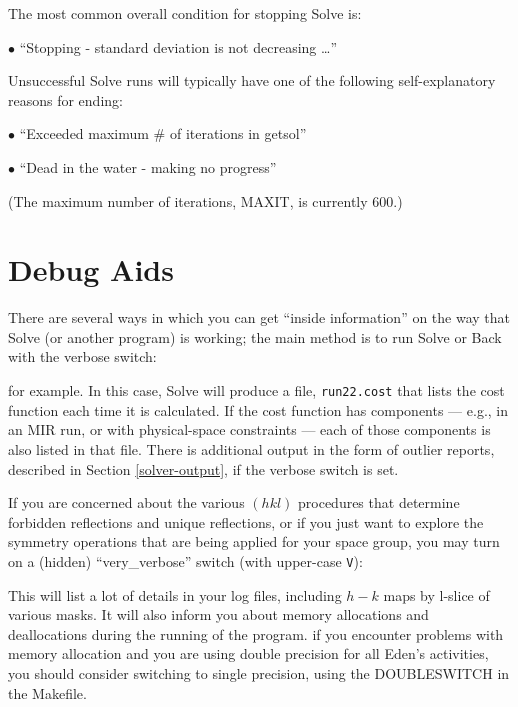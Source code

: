 \documentclass{report}
\begin{document}
{\vspace {0.1in}

The most common overall condition for stopping Solve is:

$\bullet$ ``Stopping - standard deviation is not decreasing \dots ''

\vspace {0.1in}

Unsuccessful Solve runs will typically have one of the following 
self-explanatory reasons for ending:

$\bullet$ ``Exceeded maximum \# of iterations in getsol''

$\bullet$ ``Dead in the water - making no progress''

(The maximum number of iterations, MAXIT, is currently 600.)

\section {Debug Aids}
\label{advanced-debug}


There are several ways in which you can get ``inside information'' on the
way that Solve (or another program) is working; the main method
is to run Solve or Back with the verbose switch:


for example.  In this case, Solve will produce a file, {\tt run22.cost} that
lists the cost function each time it is calculated.  If the cost function 
has components --- e.g., in an MIR run, 
or with physical-space constraints
--- each of those components is also listed in that file.
There is additional output in the form of outlier reports, described in 
Section \ref{solver-output}, if the verbose switch is set.

\vspace {0.1in}

If you are concerned about the various $(hkl)$ procedures that determine 
forbidden reflections and unique reflections, or if you 
just want to explore the symmetry operations that are being applied for
your space group, you may turn on a (hidden) 
``very\_verbose'' switch (with upper-case {\tt V}):


This will list a lot of details in your log files, including $h - k$
maps by l-slice of various masks.  It will also inform you about memory allocations
and deallocations during the running of the program.
if you encounter problems with memory allocation and you are using double precision
for all Eden's activities, you should consider switching to single precision, using the
DOUBLESWITCH in the Makefile.

}
\end{document}
